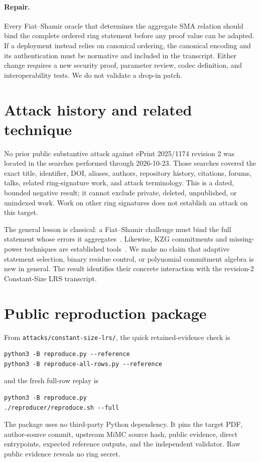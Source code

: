 \documentclass[10pt,a4paper]{article}
\begin{document}
\paragraph{Repair.}
Every Fiat--Shamir oracle that determines the aggregate SMA relation should
bind the complete ordered ring statement before any proof value can be
adapted. If a deployment instead relies on canonical ordering, the canonical
encoding and its authentication must be normative and included in the
transcript. Either change requires a new security proof, parameter review,
codec definition, and interoperability tests. We do not validate a drop-in
patch.

\section{Attack history and related technique}

No prior public substantive attack against ePrint 2025/1174 revision 2 was
located in the searches performed through 2026-10-23. Those searches covered the exact title,
identifier, DOI, aliases, authors, repository history, citations, forums,
talks, related ring-signature work, and attack terminology. This is a dated,
bounded negative result; it cannot exclude private, deleted, unpublished, or
unindexed work. Work on other ring signatures does not establish an attack on
this target.

The general lesson is classical: a Fiat--Shamir challenge must bind the full
statement whose errors it aggregates~\cite{fiatshamir}. Likewise, KZG
commitments and missing-power techniques are established tools~\cite{kzg}.
We make no claim that adaptive statement selection, binary residue control,
or polynomial commitment algebra is new in general. The result identifies
their concrete interaction with the revision-2 Constant-Size LRS transcript.

\section{Public reproduction package}

From \texttt{attacks/constant-size-lrs/}, the quick retained-evidence check is
\begin{verbatim}
python3 -B reproduce.py --reference
python3 -B reproduce-all-rows.py --reference
\end{verbatim}
and the fresh full-row replay is
\begin{verbatim}
python3 -B reproduce.py
./reproducer/reproduce.sh --full
\end{verbatim}
The package uses no third-party Python dependency. It pins the target PDF,
author-source commit, upstream MiMC source hash, public evidence, direct
entrypoints, expected reference outputs, and the independent validator. Raw
public evidence reveals no ring secret.
\end{document}

